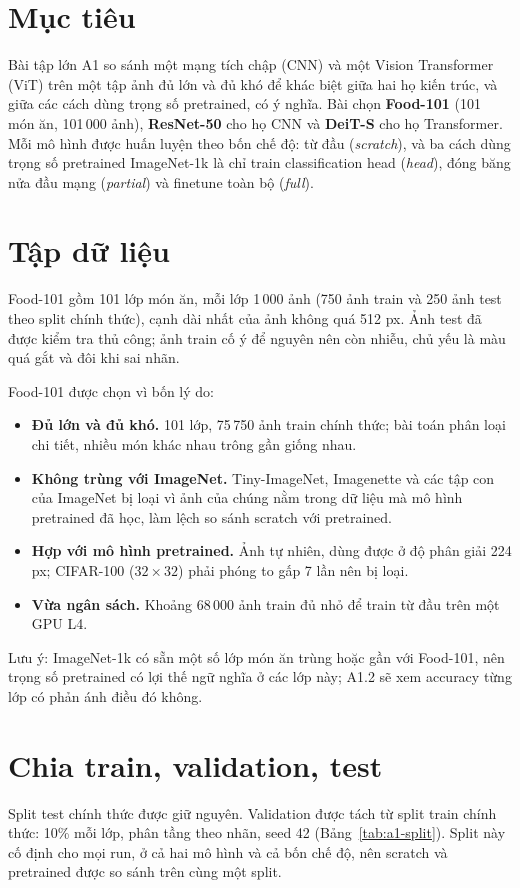 \documentclass[11pt,a4paper]{article}
\begin{document}
\section{Mục tiêu}\label{sec:a1-goals}
Bài tập lớn A1 so sánh một mạng tích chập (CNN) và một Vision Transformer (ViT) trên một tập ảnh đủ lớn và đủ khó để khác biệt giữa hai họ kiến trúc, và giữa các cách dùng trọng số pretrained, có ý nghĩa. Bài chọn \textbf{Food-101} (101 món ăn, 101\,000 ảnh), \textbf{ResNet-50} cho họ CNN và \textbf{DeiT-S} cho họ Transformer. Mỗi mô hình được huấn luyện theo bốn chế độ: từ đầu (\emph{scratch}), và ba cách dùng trọng số pretrained ImageNet-1k là chỉ train classification head (\emph{head}), đóng băng nửa đầu mạng (\emph{partial}) và finetune toàn bộ (\emph{full}).

\section{Tập dữ liệu}\label{sec:a1-dataset}\label{sec:a1-reason}
Food-101 gồm 101 lớp món ăn, mỗi lớp 1\,000 ảnh (750 ảnh train và 250 ảnh test theo split chính thức), cạnh dài nhất của ảnh không quá 512 px. Ảnh test đã được kiểm tra thủ công; ảnh train cố ý để nguyên nên còn nhiễu, chủ yếu là màu quá gắt và đôi khi sai nhãn.

Food-101 được chọn vì bốn lý do:
\begin{itemize}
\item \textbf{Đủ lớn và đủ khó.} 101 lớp, 75\,750 ảnh train chính thức; bài toán phân loại chi tiết, nhiều món khác nhau trông gần giống nhau.
\item \textbf{Không trùng với ImageNet.} Tiny-ImageNet, Imagenette và các tập con của ImageNet bị loại vì ảnh của chúng nằm trong dữ liệu mà mô hình pretrained đã học, làm lệch so sánh scratch với pretrained.
\item \textbf{Hợp với mô hình pretrained.} Ảnh tự nhiên, dùng được ở độ phân giải 224 px; CIFAR-100 (\(32\times32\)) phải phóng to gấp 7 lần nên bị loại.
\item \textbf{Vừa ngân sách.} Khoảng 68\,000 ảnh train đủ nhỏ để train từ đầu trên một GPU L4.
\end{itemize}

Lưu ý: ImageNet-1k có sẵn một số lớp món ăn trùng hoặc gần với Food-101, nên trọng số pretrained có lợi thế ngữ nghĩa ở các lớp này; A1.2 sẽ xem accuracy từng lớp có phản ánh điều đó không.

\section{Chia train, validation, test}\label{sec:a1-split}
Split test chính thức được giữ nguyên. Validation được tách từ split train chính thức: 10\% mỗi lớp, phân tầng theo nhãn, seed 42 (Bảng~\ref{tab:a1-split}). Split này cố định cho mọi run, ở cả hai mô hình và cả bốn chế độ, nên scratch và pretrained được so sánh trên cùng một split.
\end{document}
